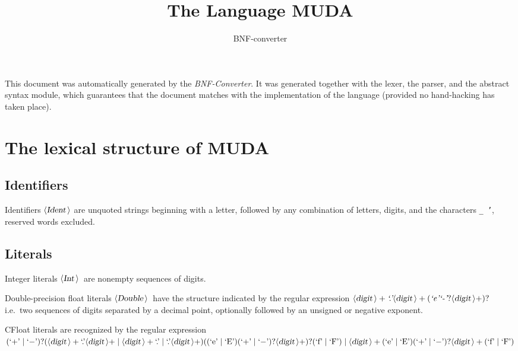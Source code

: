\documentclass[a4paper,11pt]{article}
\author{BNF-converter}
\title{The Language MUDA}
\begin{document}
\maketitle

\newcommand{\emptyP}{\mbox{$\epsilon$}}
\newcommand{\terminal}[1]{\mbox{{\texttt {#1}}}}
\newcommand{\nonterminal}[1]{\mbox{$\langle \mbox{{\sl #1 }} \! \rangle$}}
\newcommand{\arrow}{\mbox{::=}}
\newcommand{\delimit}{\mbox{$|$}}
\newcommand{\reserved}[1]{\mbox{{\texttt {#1}}}}
\newcommand{\literal}[1]{\mbox{{\texttt {#1}}}}
\newcommand{\symb}[1]{\mbox{{\texttt {#1}}}}

This document was automatically generated by the {\em BNF-Converter}. It was generated together with the lexer, the parser, and the abstract syntax module, which guarantees that the document matches with the implementation of the language (provided no hand-hacking has taken place).

\section*{The lexical structure of MUDA}
\subsection*{Identifiers}
Identifiers \nonterminal{Ident} are unquoted strings beginning with a letter,
followed by any combination of letters, digits, and the characters {\tt \_ '},
reserved words excluded.


\subsection*{Literals}
Integer literals \nonterminal{Int}\ are nonempty sequences of digits.


Double-precision float literals \nonterminal{Double}\ have the structure
indicated by the regular expression $\nonterminal{digit}+ \mbox{{\it `.'}} \nonterminal{digit}+ (\mbox{{\it `e'}} \mbox{{\it `-'}}? \nonterminal{digit}+)?$ i.e.\
two sequences of digits separated by a decimal point, optionally
followed by an unsigned or negative exponent.






CFloat literals are recognized by the regular expression
\((\mbox{`{$+$}'} \mid \mbox{`{$-$}'})? ({\nonterminal{digit}}+ \mbox{`.'} {\nonterminal{digit}}+ \mid {\nonterminal{digit}}+ \mbox{`.'} \mid \mbox{`.'} {\nonterminal{digit}}+) ((\mbox{`e'} \mid \mbox{`E'}) (\mbox{`{$+$}'} \mid \mbox{`{$-$}'})? {\nonterminal{digit}}+)? (\mbox{`f'} \mid \mbox{`F'}) \mid {\nonterminal{digit}}+ (\mbox{`e'} \mid \mbox{`E'}) (\mbox{`{$+$}'} \mid \mbox{`{$-$}'})? {\nonterminal{digit}}+ (\mbox{`f'} \mid \mbox{`F'})\)
\end{document}

